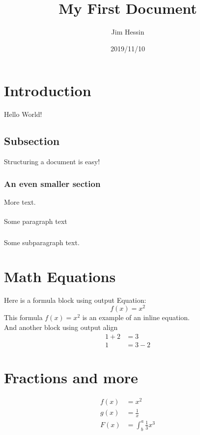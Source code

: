 \documentclass{article}
\title{My First Document}
\date{2019/11/10}
\author{Jim Hessin}
\begin{document}
  \maketitle
  \newpage

  \section{Introduction}

  Hello World!

  \subsection{Subsection}

  Structuring a document is easy!

  \subsubsection{An even smaller section}

  More text.

  \paragraph{}

  Some paragraph text

  \subparagraph{}

  Some subparagraph text.

  \section{Math Equations}

  Here is a formula block
  using output Equation:
  \begin{equation*}
    f(x) = x^2
  \end{equation*}
  This formula $f(x) = x^2$ is an example of an inline equation. \\
  And another block using output align
  \begin{align*}
    1 + 2 &= 3 \\
    1 &= 3 - 2
  \end{align*}

  \section{Fractions and more}

  \begin{align*}
    f(x) &= x^2 \\
    g(x) &= \frac{1}{x}\\
    F(x) &= \int^a_b \frac{1}{3}x^3
  \end{align*}
\end{document}
